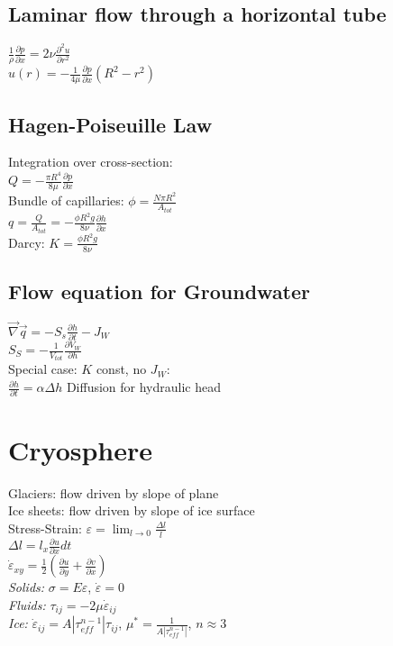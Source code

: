\subsection*{Laminar flow through a horizontal tube}
$\frac{1}{\rho}\frac{\partial p}{\partial x}=2\nu\frac{\partial^2 u}{\partial r^2}$\\
$u(r)=-\frac{1}{4\mu}\frac{\partial p}{\partial x}(R^2-r^2)$
\subsection*{Hagen-Poiseuille Law}
Integration over cross-section:\\
$Q=-\frac{\pi R^4}{8\mu}\frac{\partial p}{\partial x}$\\
Bundle of capillaries: $\phi = \frac{N\pi R^2}{A_{tot}}$\\
$q=\frac{Q}{A_{tot}}=-\frac{\phi R^2g}{8\nu}\frac{\partial h}{\partial x}$\\
Darcy: $K=\frac{\phi R^2 g}{8\nu}$
\subsection*{Flow equation for Groundwater}
$\vec{\nabla}\vec{q}=-S_s\frac{\partial h}{\partial t}-J_W$\\
$S_S=-\frac{1}{V_{tot}}\frac{\partial V_W}{\partial h}$\\
Special case: $K$ const, no $J_W$:\\
$\frac{\partial h}{\partial t}=\alpha \Delta h$ Diffusion for hydraulic head
\section*{Cryosphere}
Glaciers: flow driven by slope of plane\\
Ice sheets: flow driven by slope of ice surface\\
Stress-Strain: $\varepsilon=\lim_{l\rightarrow0}\frac{\Delta l}{l}$\\
$\Delta l=l_x\frac{\partial u}{\partial x}dt$\\
$\dot{\varepsilon}_{xy}=\frac{1}{2}\left(\frac{\partial u}{\partial y}+\frac{\partial v}{\partial x}\right)$\\
\textit{Solids:} $\sigma = E\varepsilon$, $\dot{\varepsilon}=0$\\
\textit{Fluids:} $\tau_{ij}=-2\mu\dot{\varepsilon}_{ij}$\\
\textit{Ice:} $\dot{\varepsilon}_{ij}=A|\tau_{eff}^{n-1}|\tau_{ij}$, $\mu^*=\frac{1}{A|\tau_{eff}^{n-1}|}$, $n\approx 3$\\
